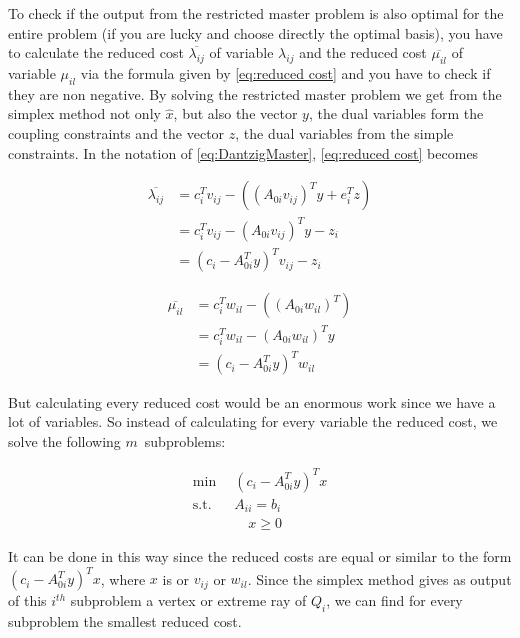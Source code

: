 \documentclass[a4paper,12pt]{article}
\begin{document}
To check if the output from the restricted master problem is also optimal for the entire problem (if you are lucky and choose directly the optimal basis), you have to calculate the reduced cost $\overline{\lambda_{ij}}$ of variable $\lambda_{ij}$ and the reduced cost $\overline{\mu_{il}}$ of variable $\mu_{il}$ via the formula given by \eqref{eq:reduced cost} and you have to check if they are non negative. By solving the restricted master problem we get from the simplex method not only $\widehat{x}$, but also the vector $y$, the dual variables form the coupling constraints and the vector $z$, the dual variables from the simple constraints. In the notation of \eqref{eq:DantzigMaster}, \eqref{eq:reduced cost} becomes



\begin{equation}
\label{eq:reducedCostlDantzig}
\begin{aligned}
\overline{\lambda_{ij}} &= c_i^Tv_{ij} - ((A_{0i}v_{ij})^Ty+e_i^Tz) \\
 &= c_i^Tv_{ij} - (A_{0i}v_{ij})^Ty - z_i \\
 &= (c_i - A_{0i}^Ty)^Tv_{ij} - z_i
\end{aligned}
\end{equation}

\begin{equation}
\label{eq:reducedCostmDantzig}
\begin{aligned}
\overline{\mu_{il}} &= c_i^Tw_{il} - ((A_{0i}w_{il})^T) \\
 &= c_i^Tw_{il} - (A_{0i}w_{il})^Ty  \\
 &= (c_i - A_{0i}^Ty)^Tw_{il} 
\end{aligned}
\end{equation}

But calculating every reduced cost would be an enormous work since we have a lot of variables. So instead of calculating for every variable the reduced cost, we solve the following $m$~subproblems:

\begin{equation}
\begin{aligned}
\min \enspace &(c_i - A_{0i}^Ty)^Tx \\
\text{s.t.} \enspace &A_{ii} = b_i \\
 & \quad x \geq 0
\end{aligned}
\label{eq:subproblem}
\end{equation}

It can be done in this way since the reduced costs are equal or similar to the form $(c_i - A_{0i}^Ty)^Tx$, where $x$ is or $v_{ij}$ or $w_{il}$. Since the simplex method gives as output of this $i^{th}$ subproblem a vertex or extreme ray of $Q_i$, we can find for every subproblem the smallest reduced cost. 
\end{document}

